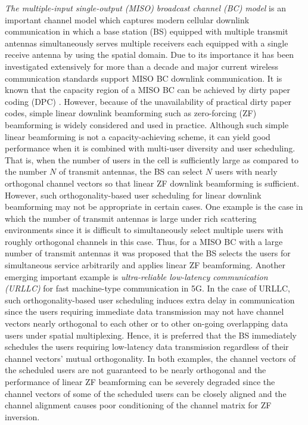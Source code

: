 \documentclass[11pt, draft, onecolumn ]{IEEEtran}
\begin{document}
{\em The multiple-input single-output (MISO)  broadcast channel (BC) model} is an important channel model which captures modern cellular downlink communication in which a base station (BS) equipped  with multiple transmit antennas simultaneously serves multiple receivers each equipped with a single receive antenna  by using the spatial domain. Due to its importance it has been investigated extensively  for more than a decade and major current  wireless communication standards  support MISO BC downlink communication\cite{Weingartenetal06IT,Sharif&Hassibi:05IT,Yoo&Goldsmith,LTEMUMIMOphy}.
It is known that  the capacity region of a MISO BC can be achieved by dirty paper coding (DPC) \cite{Weingartenetal06IT}.  However, because of the unavailability of practical dirty paper codes,  simple linear downlink beamforming such as zero-forcing (ZF) beamforming is widely considered and used in practice\cite{Spencer&Swindlehurst&Haardt:04IT,Yoo&Goldsmith}. Although such simple linear beamforming is not a capacity-achieving scheme, it can yield good performance when it is combined with multi-user diversity and user scheduling\cite{Sharif&Hassibi:05IT,Yoo&Goldsmith,LeeSung18COM,LeeSungSeo,LeeSungKountouris}.
 That is, when the number of users in the cell is sufficiently large as compared to the number $N$ of transmit antennas, the BS
can select $N$ users with nearly orthogonal channel vectors so
that linear ZF downlink
beamforming is sufficient.
However,  such orthogonality-based user scheduling for linear downlink beamforming may not be appropriate in certain cases. One example is the case in which the number of transmit antennas is large under rich scattering environments since it is difficult to simultaneously select multiple users with roughly orthogonal channels  in this case\cite{Huh:12IT,LeeSungSeo,LeeSungKountouris}. Thus, for
a MISO BC with a large number of transmit antennas  it was proposed
that the BS selects the users for simultaneous service arbitrarily and applies linear
ZF beamforming\cite{Huh:12IT}.
 Another emerging important example is  {\em ultra-reliable low-latency  communication (URLLC)} for fast machine-type communication in 5G. %
  In the case of URLLC,
  such orthogonality-based user scheduling
induces extra delay in communication since the users requiring immediate data transmission may not have channel vectors nearly orthogonal to each other or to other on-going overlapping data users under spatial multiplexing.  Hence, it is  preferred that  the BS immediately schedules the users requiring low-latency  data transmission regardless of their channel vectors' mutual orthogonality. In both examples, the channel vectors of the scheduled users are not guaranteed to be nearly orthogonal and the performance of linear ZF beamforming can be severely degraded since
 the
channel vectors of some of the scheduled users can be closely
aligned and the channel alignment causes  poor conditioning of the channel matrix for ZF inversion.
\end{document}
